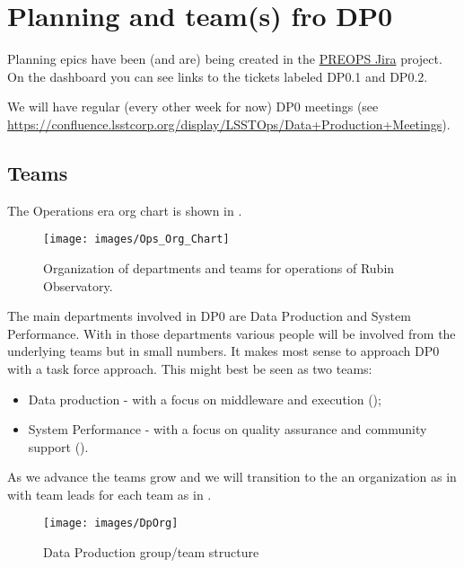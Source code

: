 \section{Planning and team(s) fro DP0} \label{sec:plan}

Planning epics have been (and are) being created in the \href{https://jira.lsstcorp.org/secure/Dashboard.jspa?selectPageId=15608}{PREOPS Jira} project.
On the dashboard you can see links to the  tickets labeled DP0.1 and DP0.2.

We will have regular (every other week for now) DP0 meetings (see \url{https://confluence.lsstcorp.org/display/LSSTOps/Data+Production+Meetings}).

\subsection {Teams}

The Operations era org chart is shown in .


\begin{figure}
\begin{center}
\texttt{[image: images/Ops\_Org\_Chart]}
\end{center}
\caption{ Organization of departments and teams  for operations of Rubin Observatory. \label{fig:org}}
\end{figure}

The main departments involved in DP0 are Data Production and System Performance. With in those departments various people will be involved from the underlying teams but in small numbers. It makes most sense to approach DP0 with a task force approach. This might best be seen as two teams:

\begin{itemize}
\item Data production - with a focus on middleware and execution ();
\item System Performance - with a focus on quality assurance and community support ().
\end{itemize}

As we advance the teams grow and we will transition to the an organization as in 
with team leads for each team as in .


\begin{figure}
\begin{center}
\texttt{[image: images/DpOrg]}
\end{center}
\caption{Data Production group/team structure \label{fig:dporg}}
\end{figure}

